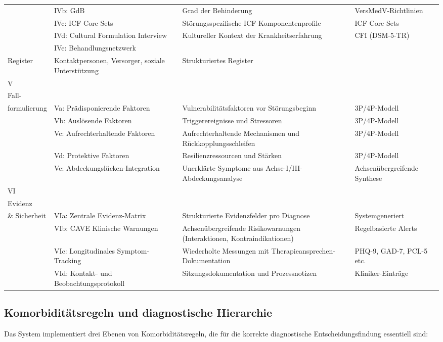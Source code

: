 \documentclass[11pt,a4paper]{article}
\begin{document}
\begin{longtable}{@{}L{1.8cm}L{2.4cm}L{5.0cm}L{4.0cm}@{}}
 & IVb: GdB & Grad der Behinderung & VersMedV-Richtlinien \\
 & IVc: ICF Core Sets & St\"orungsspezifische ICF-Komponentenprofile & ICF Core Sets \\
 & IVd: Cultural Formulation Interview & Kultureller Kontext der Krankheitserfahrung & CFI (DSM-5-TR) \\
 & IVe: Behandlungsnetzwerk\\Register & Kontaktpersonen, Versorger, soziale Unterst\"utzung & Strukturiertes Register \\
\midrule
V\\Fall-\\formulierung & Va: Pr\"adisponierende Faktoren & Vulnerabilit\"atsfaktoren vor St\"orungsbeginn & 3P/4P-Modell \\
 & Vb: Ausl\"osende Faktoren & Triggerereignisse und Stressoren & 3P/4P-Modell \\
 & Vc: Aufrechterhaltende Faktoren & Aufrechterhaltende Mechanismen und R\"uckkopplungsschleifen & 3P/4P-Modell \\
 & Vd: Protektive Faktoren & Resilienzressourcen und St\"arken & 3P/4P-Modell \\
 & Ve: Abdeckungsl\"ucken-Integration & Unerkl\"arte Symptome aus Achse-I/III-Abdeckungsanalyse & Achsen\"ubergreifende Synthese \\
\midrule
VI\\Evidenz\\\& Sicherheit & VIa: Zentrale Evidenz-Matrix & Strukturierte Evidenzfelder pro Diagnose & Systemgeneriert \\
 & VIb: CAVE Klinische Warnungen & Achsen\"ubergreifende Risikowarnungen (Interaktionen, Kontraindikationen) & Regelbasierte Alerts \\
 & VIc: Longitudinales Symptom-Tracking & Wiederholte Messungen mit Therapieansprechen-Dokumentation & PHQ-9, GAD-7, PCL-5 etc. \\
 & VId: Kontakt- und Beobachtungsprotokoll & Sitzungsdokumentation und Prozessnotizen & Kliniker-Eintr\"age \\
\end{longtable}
\normalsize

\subsection{Komorbidit\"atsregeln und diagnostische Hierarchie}
\label{sec:komorbiditaet}

Das System implementiert drei Ebenen von Komorbidit\"atsregeln, die f\"ur die korrekte diagnostische Entscheidungsfindung essentiell sind:
\end{document}
